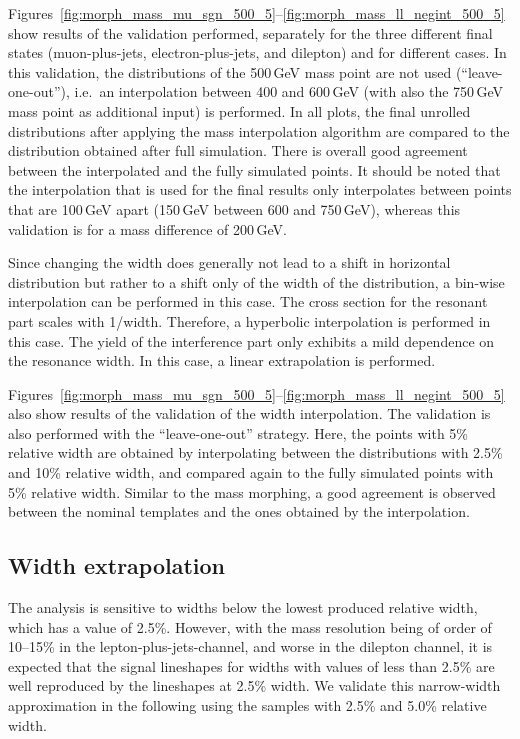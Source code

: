 Figures~\ref{fig:morph_mass_mu_sgn_500_5}--\ref{fig:morph_mass_ll_negint_500_5} show results of the validation performed, separately for the three different final states (muon-plus-jets, electron-plus-jets, and dilepton) and for different cases.
In this validation, the distributions of the 500\,GeV mass point are not used (``leave-one-out''), i.e.\ an interpolation between 400 and 600\,GeV (with also the 750\,GeV mass point as additional input) is performed.
In all plots, the final unrolled distributions after applying the mass interpolation algorithm are compared to the distribution obtained after full simulation.
There is overall good agreement between the interpolated and the fully simulated points.
It should be noted that the interpolation that is used for the final results only interpolates between points that are 100\,GeV apart (150\,GeV between 600 and 750\,GeV), whereas this validation is for a mass difference of 200\,GeV.

Since changing the width does generally not lead to a shift in horizontal distribution but rather to a shift only of the width of the distribution, a bin-wise interpolation can be performed in this case.
The cross section for the resonant part scales with 1/width.
Therefore, a hyperbolic interpolation is performed in this case.
The yield of the interference part only exhibits a mild dependence on the resonance width.
In this case, a linear extrapolation is performed.

Figures~\ref{fig:morph_mass_mu_sgn_500_5}--\ref{fig:morph_mass_ll_negint_500_5} also show results of the validation of the width interpolation.
The validation is also performed with the ``leave-one-out'' strategy.
Here, the points with 5\% relative width are obtained by interpolating between the distributions with 2.5\% and 10\% relative width, and compared again to the fully simulated points with 5\% relative width.
Similar to the mass morphing, a good agreement is observed between the nominal templates and the ones obtained by the interpolation.


\subsection{Width extrapolation}

The analysis is sensitive to widths below the lowest produced relative width, which has a value of 2.5\%.
However, with the mass resolution being of order of 10--15\% in the lepton-plus-jets-channel, and worse in the dilepton channel, it is expected that the signal lineshapes for widths with values of less than 2.5\% are well reproduced by the lineshapes at 2.5\% width.
We validate this narrow-width approximation in the following using the samples with 2.5\% and 5.0\% relative width.

